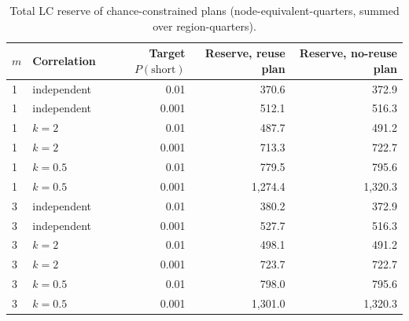 \documentclass{article} %
\begin{document}
\begin{table}[h]
\caption{Total LC reserve of chance-constrained plans (node-equivalent-quarters, summed over region-quarters).}
\label{tab:reserve_app}
\begin{center}
\small
\begin{tabular}{llrrr}
\toprule
$m$ & Correlation & Target $P(\text{short})$ & Reserve, reuse plan & Reserve, no-reuse plan \\
\midrule
1 & independent & 0.01 & 370.6 & 372.9 \\
1 & independent & 0.001 & 512.1 & 516.3 \\
1 & $k=2$ & 0.01 & 487.7 & 491.2 \\
1 & $k=2$ & 0.001 & 713.3 & 722.7 \\
1 & $k=0.5$ & 0.01 & 779.5 & 795.6 \\
1 & $k=0.5$ & 0.001 & 1,274.4 & 1,320.3 \\
3 & independent & 0.01 & 380.2 & 372.9 \\
3 & independent & 0.001 & 527.7 & 516.3 \\
3 & $k=2$ & 0.01 & 498.1 & 491.2 \\
3 & $k=2$ & 0.001 & 723.7 & 722.7 \\
3 & $k=0.5$ & 0.01 & 798.0 & 795.6 \\
3 & $k=0.5$ & 0.001 & 1,301.0 & 1,320.3 \\
\bottomrule
\end{tabular}
\end{center}
\end{table}

\begin{table}[h]
\caption{Chance-constrained SLO headroom at $m=1$ (expected-value baseline with LC headroom multiplier 1; independent replay with 50,000 samples). Price: SLO carbon price (\%). $P_{\max}$: validated worst region-quarter $P(\text{short})$.}
\label{tab:cc}
\begin{center}
\small
{}
\end{center}
\end{table}
\end{document}
